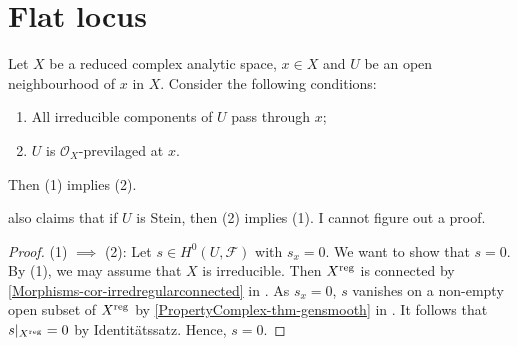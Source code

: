 \section{Flat locus}


\begin{proposition}\label{prop-previaOX}
    Let $X$ be a reduced complex analytic space, $x\in X$ and $U$ be an open neighbourhood of $x$ in $X$. Consider the following conditions:
    \begin{enumerate}
        \item All irreducible components of $U$ pass through $x$;
        \item $U$ is $\mathcal{O}_X$-previlaged at $x$.
    \end{enumerate}
    Then (1) implies (2). %
\end{proposition}

\cite{Fri67} also claims that if $U$ is Stein, then (2) implies (1). I cannot figure out a proof. 

\begin{proof}
    (1) $\implies$ (2): Let $s\in H^0(U,\mathcal{F})$ with $s_x=0$. We want to show that $s=0$. By (1), we may assume that $X$ is irreducible. Then $X^{\operatorname{reg}}$ is connected by \cref{Morphisms-cor-irredregularconnected}  in . 
    As $s_x=0$, $s$ vanishes on a non-empty open subset of $X^{\operatorname{reg}}$ by \cref{PropertyComplex-thm-gensmooth} in . It follows that $s|_{X^{\operatorname{reg}}}=0$ by Identitätssatz. Hence, $s=0$.


\end{proof}

